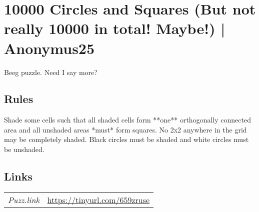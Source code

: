 \section{10000 Circles and Squares (But not really 10000 in total! Maybe!) | {\normalfont Anonymus25}}
\label{sec:36-10000-circles-and-squares-but-not-really-10000-in-total-maybe-anonymus25}
Beeg puzzle. Need I say more?
\subsection*{Rules}
\begin{markdown}
Shade some cells such that all shaded cells form **one** orthogonally connected area and all unshaded areas *must* form squares. No 2x2 anywhere in the grid may be completely shaded. Black circles must be shaded and white circles must be unshaded.
\end{markdown}
\subsection*{Links}
\begin{tabularx}{\textwidth}{l X}
\emph{Puzz.link} & \url{https://tinyurl.com/659zruse} \\
\end{tabularx}
\pagebreak
